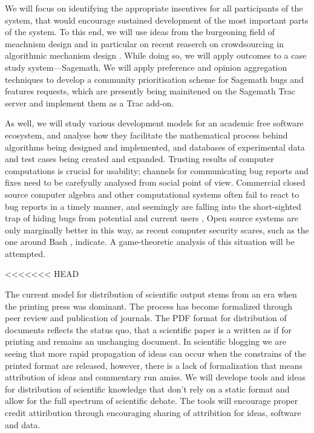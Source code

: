 \begin{workpackage}[id=social-aspects,wphases=1-48!.5,
  title=Social Aspects,
<<<<<<< HEAD
=======
  lead=UO,
>>>>>>> e490abbfa8a91427570f1a7695a6a95cd4610713
  UORM=1,USHRM=8]
\begin{wpdescription}
We will focus on identifying the appropriate insentives for all
participants of the system, that would encourage sustained development of the
most important parts of the system.  To this end, we will use ideas from the
burgeoning field of meachnism design \cite{AGTbook} and in
particular on recent reaserch on crowdsourcing in algorithmic mechanism design
\cite{crowds}.  While doing so, we will apply outcomes to a case study
system---Sagemath.
We will apply preference and opinion aggregation techniques \cite{pref-aggr} to  develop
a community prioritisation scheme for Sagemath bugs and features requests, which 
are presently being mainitened on the Sagemath Trac server \cite{trac-sagemath}  and implement
them as a Trac \cite{Trac} add-on.

As well, we will study various development models for an academic free software ecosystem,
and analyse how they facilitate the mathematical process behind algorithms being
designed and implemented,  and databases of experimental data and test cases being
created and expanded.
Trusting results of computer
computations is crucial for usability; channels for communicating bug reports
and fixes need to be carefyully analysed from social point of view. 
Commercial closed source computer algebra and other computational systems often
fail to react to bug reports in a timely manner, and seemingly are falling into the
short-sighted trap of hiding bugs from potential and current users \cite{misfort},
Open source  systems are only marginally better in this way, as recent
computer security scares, such as the one around Bash \cite{shellshock}, indicate.
A game-theoretic analysis of this situation will be attempted.
\end{wpdescription}

<<<<<<< HEAD
\begin{task}[title=Modern Distribution of Scientific Output]
  The current model for distribution of scientific output stems from an era when the printing press was dominant. The process has become formalized through peer review and publication of journals. The PDF format for distribution of documents reflects the status quo, that a scientific paper is a written as if for printing and remains an unchanging document. In scientific blogging we are seeing that more rapid propagation of ideas can occur when the constrains of the printed format are released, however, there is a lack of formalization that means attribution of ideas and commentary run amiss. We will develope tools and ideas for distribution of scientific knowledge that don't rely on a static format and allow for the full spectrum of scientific debate. The tools will encourage proper credit attiribution through encouraging sharing of attribition for ideas, software and data. 
\end{task}


\end{workpackage}
